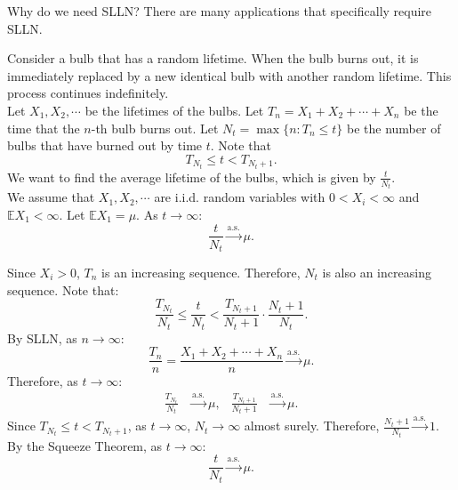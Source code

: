 \documentclass{huhtakm-template-book-v2}
\newcommand{\expect}{\mathbb{E}}
\begin{document}
    Why do we need SLLN? There are many applications that specifically require SLLN.
    \begin{eg} 
        Consider a bulb that has a random lifetime. When the bulb burns out, it is immediately replaced by a new identical bulb with another random lifetime. This process continues indefinitely.\\
        Let $X_{1},X_{2},\cdots$ be the lifetimes of the bulbs. Let $T_{n} = X_{1}+X_{2}+\cdots+X_{n}$ be the time that the $n$-th bulb burns out. Let $N_{t} = \max\{n:T_{n} \leq t\}$ be the number of bulbs that have burned out by time $t$. Note that
        \begin{equation*}
            T_{N_{t}} \leq t < T_{N_{t}+1}.
        \end{equation*}
        We want to find the average lifetime of the bulbs, which is given by $\frac{t}{N_{t}}$.\\
        We assume that $X_{1},X_{2},\cdots$ are i.i.d. random variables with $0 < X_{i} < \infty$ and $\expect{X_{1}} < \infty$. Let $\expect{X_{1}} = \mu$. 
        As $t \to \infty$:
        \begin{equation*}
            \frac{t}{N_{t}} \xrightarrow{\text{a.s.}} \mu.
        \end{equation*}
    \end{eg}
    \begin{proofing}
        Since $X_{i} > 0$, $T_{n}$ is an increasing sequence. Therefore, $N_{t}$ is also an increasing sequence. Note that:
        \begin{equation*}
            \frac{T_{N_{t}}}{N_{t}} \leq \frac{t}{N_{t}} < \frac{T_{N_{t}+1}}{N_{t}+1}\cdot\frac{N_{t}+1}{N_{t}}.
        \end{equation*}
        By SLLN, as $n \to \infty$:
        \begin{equation*}
            \frac{T_{n}}{n} = \frac{X_{1}+X_{2}+\cdots+X_{n}}{n} \xrightarrow{\text{a.s.}} \mu.
        \end{equation*} 
        Therefore, as $t \to \infty$:
        \begin{align*}
            \frac{T_{N_{t}}}{N_{t}} &\xrightarrow{\text{a.s.}} \mu, & \frac{T_{N_{t}+1}}{N_{t}+1} &\xrightarrow{\text{a.s.}} \mu.
        \end{align*}
        Since $T_{N_{t}} \leq t < T_{N_{t}+1}$, as $t \to \infty$, $N_{t} \to \infty$ almost surely. Therefore, $\frac{N_{t}+1}{N_{t}} \xrightarrow{\text{a.s.}} 1$.\\
        By the Squeeze Theorem, as $t \to \infty$:
        \begin{equation*}
            \frac{t}{N_{t}} \xrightarrow{\text{a.s.}} \mu.
        \end{equation*}
    \end{proofing}
\end{document}
